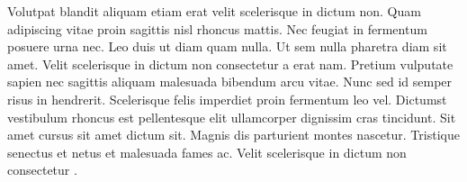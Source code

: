\documentclass[a4paper]{article}
\begin{document}
Volutpat blandit aliquam etiam erat velit scelerisque in dictum non. Quam adipiscing vitae proin sagittis nisl rhoncus mattis. Nec feugiat in fermentum posuere urna nec. Leo duis ut diam quam nulla. Ut sem nulla pharetra diam sit amet. Velit scelerisque in dictum non consectetur a erat nam. Pretium vulputate sapien nec sagittis aliquam malesuada bibendum arcu vitae. Nunc sed id semper risus in hendrerit. Scelerisque felis imperdiet proin fermentum leo vel. Dictumst vestibulum rhoncus est pellentesque elit ullamcorper dignissim cras tincidunt. Sit amet cursus sit amet dictum sit. Magnis dis parturient montes nascetur. Tristique senectus et netus et malesuada fames ac. Velit scelerisque in dictum non consectetur \autocite{chuangstein_sample_2006}.

\printbibliography{}
\end{document}
